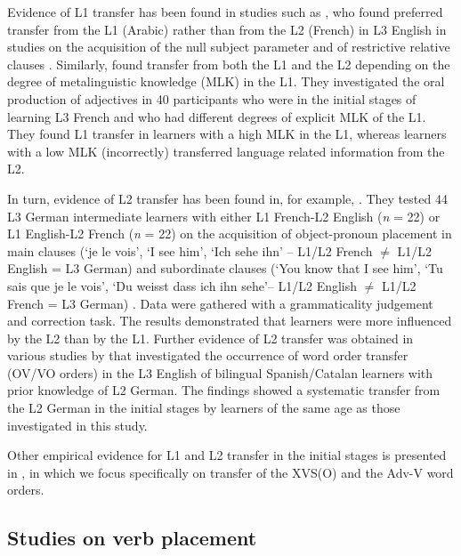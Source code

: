 \documentclass[output=paper,modfonts,nonflat, newtxmath]{langsci/langscibook}
\begin{document}
Evidence of L1 transfer has been found in studies such as \citep{Hermas2014Morphosyntax, Hermas2014Relatives}, who found preferred transfer from the L1 (Arabic) rather than from the L2 (French) in L3 English in studies on the acquisition of the null subject parameter \citep{Hermas2014Morphosyntax} and of restrictive relative clauses \citep{Hermas2014Relatives}. Similarly, \citet{FalkEtAl2015} found transfer from both the L1 and the L2 depending on the degree of metalinguistic knowledge (MLK) in the L1. They investigated the oral production of adjectives in 40 participants who were in the initial stages of learning L3 French and who had different degrees of explicit MLK of the L1. They found L1 transfer in learners with a high MLK in the L1, whereas learners with a low MLK (incorrectly) transferred language related information from the L2.

In turn, evidence of L2 transfer has been found in, for example, \citet{FalkBardel2011}. They tested 44 L3 German intermediate learners with either L1 French-L2 English (\textit{n} = 22) or L1 English-L2 French (\textit{n} = 22) on the acquisition of object-pronoun placement in main clauses (‘je {le} vois’, ‘I see {him}’, ‘Ich sehe {ihn’} – L1/L2 French ${\neq}$ L1/L2 English = L3 German) and subordinate clauses (‘You know that I see {him}’, ‘Tu sais que je {le} vois’, ‘Du weisst dass ich {ihn} sehe’– L1/L2 English ${\neq}$ L1/L2 French = L3 German) \citep[60]{FalkBardel2011}. Data were gathered with a grammaticality judgement and correction task. The results demonstrated that learners were more influenced by the L2 than by the L1. Further evidence of L2 transfer was obtained in various studies by \citet{Sánchez2012, Sánchez2015, Sánchez2016} that investigated the occurrence of word order transfer (OV/VO orders) in the L3 English of bilingual Spanish/Catalan learners with prior knowledge of L2 German. The findings showed a systematic transfer from the L2 German in the initial stages by learners of the same age as those investigated in this study.

Other empirical evidence for L1 and L2 transfer in the initial stages is presented in , in which we focus specifically on transfer of the XVS(O) and the Adv-V word orders.

\subsection{{Studies} {on} {verb} {placement} }%
\label{sec:stadt:2.2}
\end{document}
